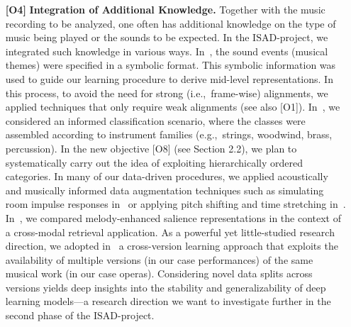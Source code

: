 \documentclass[11pt,a4paper]{article}
\def\PN{\mathrm{ISAD}}
\newcommand{\iec}{i.e.,\ }
\newcommand{\egc}{e.g.,\ }
\newenvironment{itemizePacked}{
\begin{itemize}
  \setlength{\itemsep}{1pt}
  \setlength{\parskip}{0pt}
  \setlength{\parsep}{0pt}
  \renewcommand{\labelitemi}{$\bullet$}
}{\end{itemize}}
\newcommand{\jakob}[1]{{\color{magenta} #1}}
\theoremstyle{plain} \newtheorem{define}{Definition}[section]
\begin{document}
\begin{enumerate}
\item [\textbf{[O4]}] \textbf{Integration of Additional Knowledge.}
%
%
%
Together with the music recording to be analyzed, one often has additional knowledge on the type of music being played or the sounds to be expected. In the $\PN$-project, we integrated such knowledge in various ways.
%
In~\cite{ZalkowM20_WeaklyAlignedTrain_ISMIR}, the sound events (musical themes) were specified in a symbolic format. This symbolic information was used to guide our learning procedure to derive mid-level representations. In this process, to avoid the need for strong (\iec frame-wise) alignments, we applied techniques that only require weak alignments (see also [O1]). 
%
In~\cite{TaenzerAMWLM19_InstrumentReco_ISMIR}, we considered an informed classification scenario, where the classes were assembled according to instrument families (\egc strings, woodwind, brass, percussion). In the new objective [O8] (see Section 2.2), we plan to systematically carry out the idea of exploiting hierarchically ordered categories.
%
%
In many of our data-driven procedures, we applied acoustically and musically informed data augmentation techniques such as simulating room impulse responses in~\cite{TaenzerAMWLM19_InstrumentReco_ISMIR} or applying pitch shifting and time stretching in~\cite{AbesserBM18_BassSaliency_ISMIR}.
%
In~\cite{ZalkowBM19_SalienceRetrieval_ICASSP}, we compared melody-enhanced salience representations in the context of a cross-modal retrieval application. 
%
As a powerful yet little-studied research direction, we adopted in~\cite{KrauseMW21_OperaSingingActivity_Electronics,MimilakisWAAM19_SingingVDetWagner_MML} a cross-version learning approach that exploits the availability of multiple versions (in our case performances) of the same musical work (in our case operas).%
%
Considering novel data splits across versions yields deep insights into the stability and generalizability of deep learning models---a research direction we want to investigate further in the second phase of the $\PN$-project.




\end{enumerate}
\end{document}
